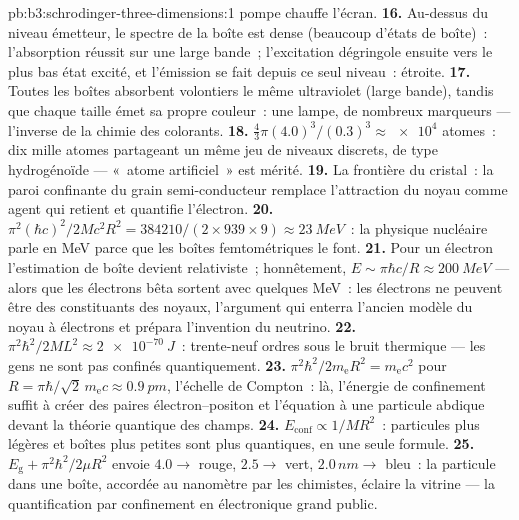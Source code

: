 \begin{solution}{pb:b3:schrodinger-three-dimensions:1}
pompe chauffe l'écran.
\textbf{16.} Au-dessus du niveau émetteur, le spectre de la boîte est
dense (beaucoup d'états de boîte)~: l'absorption réussit sur une large
bande~; l'excitation dégringole ensuite vers le plus bas état excité,
et l'émission se fait depuis ce seul niveau~: étroite.
\textbf{17.} Toutes les boîtes absorbent volontiers le même
ultraviolet (large bande), tandis que chaque taille émet sa propre
couleur~: une lampe, de nombreux marqueurs --- l'inverse de la chimie
des colorants.
\textbf{18.} $\tfrac43\pi(4.0)^3/(0.3)^3 \approx \num{e4}$ atomes~:
dix mille atomes partageant un même jeu de niveaux discrets, de type
hydrogénoïde --- «~atome artificiel~» est mérité.
\textbf{19.} La frontière du cristal~: la paroi confinante du grain
semi-conducteur remplace l'attraction du noyau comme agent qui retient
et quantifie l'électron.
\textbf{20.} $\pi^2(\hbar c)^2/2Mc^2R^2 = 384210/(2 \times 939
\times 9) \approx \qty{23}{MeV}$~: la physique nucléaire parle en MeV
parce que les boîtes femtométriques le font.
\textbf{21.} Pour un électron l'estimation de boîte devient
relativiste~; honnêtement, $E \sim \pi\hbar c/R \approx \qty{200}{MeV}$
--- alors que les électrons bêta sortent avec quelques MeV~: les
électrons ne peuvent être des constituants des noyaux, l'argument qui
enterra l'ancien modèle du noyau à électrons et prépara l'invention du
neutrino.
\textbf{22.} $\pi^2\hbar^2/2ML^2 \approx \qty{2e-70}{J}$~:
trente-neuf ordres sous le bruit thermique --- les gens ne sont pas
confinés quantiquement.
\textbf{23.} $\pi^2\hbar^2/2m_{\text{e}}R^2 = m_{\text{e}}c^2$ pour
$R = \pi\hbar/\sqrt2\,m_{\text{e}}c \approx \qty{0.9}{pm}$, l'échelle
de Compton~: là, l'énergie de confinement suffit à créer des paires
électron--positon et l'équation à une particule abdique devant la
théorie quantique des champs.
\textbf{24.} $E_{\text{conf}} \propto 1/MR^2$~: particules plus légères
et boîtes plus petites sont plus quantiques, en une seule formule.
\textbf{25.} $E_{\text{g}} + \pi^2\hbar^2/2\mu R^2$ envoie $4.0 \to$
rouge, $2.5 \to$ vert, $2.0\,\unit{nm} \to$ bleu~: la particule dans
une boîte, accordée au nanomètre par les chimistes, éclaire la vitrine
--- la quantification par confinement en électronique grand public.
\end{solution}

